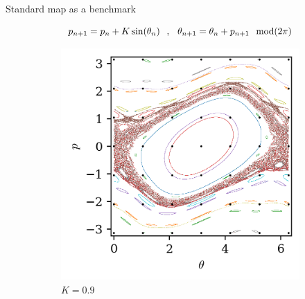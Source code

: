 \documentclass[10pt]{beamer}
\begin{document}
\begin{frame}{Standard map as a benchmark}

    \begin{equation}
        p_{n+1} = p_n + K\sin(\theta_n) \hspace{0.25cm},\hspace{0.25cm} \theta_{n+1} = \theta_n + p_{n+1} \hspace{0.25cm} \textnormal{mod}(2\pi)
      \end{equation}
    
        
      \begin{figure}
        \begin{subfigure}[b]{0.3\textwidth}
            \includegraphics[width=\textwidth]{std/map_1_0.9000.png}
            \caption{$K = 0.9$}
        \end{subfigure}
        \begin{subfigure}[b]{0.3\textwidth}

\end{subfigure}
\end{figure}
\end{frame}
\end{document}
